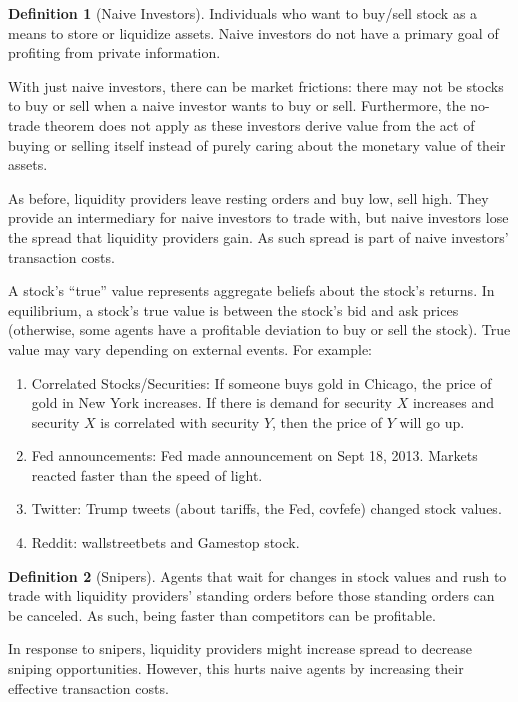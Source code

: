 \documentclass[dvipsnames]{article}
\theoremstyle{definition}
\newtheorem{definition}{Definition}[section]
\theoremstyle{remark}
\begin{document}
\begin{definition}[Naive Investors]
	Individuals who want to buy/sell stock as a means to store or liquidize assets. Naive investors do not have a primary goal of profiting from private information.
\end{definition}

With just naive investors, there can be market frictions: there may not be stocks to buy or sell when a naive investor wants to buy or sell. Furthermore, the no-trade theorem does not apply as these investors derive value from the act of buying or selling itself instead of purely caring about the monetary value of their assets. 

As before, liquidity providers leave resting orders and buy low, sell high. They provide an intermediary for naive investors to trade with, but naive investors lose the spread that liquidity providers gain. As such spread is part of naive investors' transaction costs.

A stock's ``true'' value represents aggregate beliefs about the stock's returns. In equilibrium, a stock's true value is between the stock's bid and ask prices (otherwise, some agents have a profitable deviation to buy or sell the stock). True value may vary depending on external events. For example:
\begin{enumerate}
	\item Correlated Stocks/Securities: If someone buys gold in Chicago, the price of gold in New York increases. If there is demand for security $X$ increases and security $X$ is correlated with security $Y$, then the price of $Y$ will go up.
	\item Fed announcements: Fed made announcement on Sept 18, 2013. Markets reacted faster than the speed of light. 
	\item Twitter: Trump tweets (about tariffs, the Fed, covfefe) changed stock values.
	\item Reddit: wallstreetbets and Gamestop stock.
\end{enumerate} 

\begin{definition}[Snipers]
	Agents that wait for changes in stock values and rush to trade with liquidity providers' standing orders before those standing orders can be canceled. As such, being faster than competitors can be profitable. 
\end{definition}

In response to snipers, liquidity providers might increase spread to decrease sniping opportunities. However, this hurts naive agents by increasing their effective transaction costs.
\end{document}
